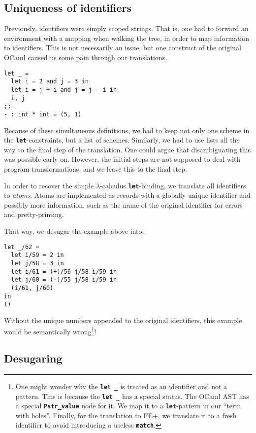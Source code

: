 \documentclass[10pt,a4paper,twoside,titlepage,twocolumn]{article}
\newcommand{\code}[1]{\textbf{\texttt{#1}}}
\begin{document}
\subsection{Uniqueness of identifiers}

Previously, identifiers were simply scoped strings. That is, one had to
forward an environment with a mapping when walking the tree, in order to map
information to identifiers. This is not necessarily an issue, but one construct
of the original OCaml caused us some pain through our translations.

\begin{verbatim}
let _ =
  let i = 2 and j = 3 in
  let i = j + i and j = j - i in
  i, j
;;
- : int * int = (5, 1)
\end{verbatim}

Because of these simultaneous definitions, we had to keep not only one scheme in
the \code{let}-constraints, but a list of schemes. Similarly, we had to use
lists all the way to the final step of the translation. One could argue that
disambiguating this was possible early on. However, the initial steps are not
supposed to deal with program transformations, and we leave this to the final
step.

In order to recover the simple $\lambda$-calculus \code{let}-binding, we
translate all identifiers to \emph{atoms}. Atoms are implemented as records with
a globally unique identifier and possibly more information, such as the name of
the original identifier for errors and pretty-printing.

That way, we desugar the example above into:

\begin{verbatim}
let _/62 =
  let i/59 = 2 in
  let j/58 = 3 in
  let i/61 = (+)/56 j/58 i/59 in
  let j/60 = (-)/55 j/58 i/59 in
  (i/61, j/60)
in
()
\end{verbatim}

Without the unique numbers appended to the original identifiers, this example
would be semantically wrong\footnote{One might wonder why the \code{let \_} is
treated as an identifier and not a pattern. This is because the \code{let \_}
has a special status. The OCaml AST has a special \code{Pstr\_value} node for
it. We map it to a \code{let}-pattern in our ``term with holes''. Finally, for
the translation to FE+, we translate it to a fresh identifier to avoid
introducing a useless \code{match}.}!

\subsection{Desugaring}
\end{document}
